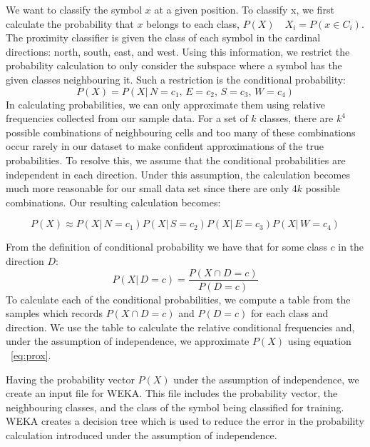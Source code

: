 
We want to classify the symbol $x$ at a given position.
To classify x, we first calculate the
probability that $x$ belongs to each class, $P(X)\quad X_i = P(x\!\in\! C_i)$.
The proximity classifier is given the class of each symbol in the
cardinal directions: north, south, east, and west. Using this information,
we restrict the probability calculation to only consider the subspace
where a symbol has the given classes neighbouring it. Such a restriction is
the conditional probability:
\[
P(X) = P(X|\,N\!=\!c_1,\,E\!=\!c_2,\,S\!=\!c_3,\,W\!=\!c_4)
\]
In calculating probabilities, we can only approximate them using relative
frequencies collected from our sample data. For a set of $k$ classes, there are $k^4$ possible combinations of neighbouring
cells and too many of these combinations occur rarely in our dataset to make
confident approximations of the true probabilities. To resolve this, we assume that
the conditional probabilities are independent in each direction. Under this
assumption, the calculation becomes much more reasonable for our small data set
since there are only $4k$ possible combinations. Our resulting calculation becomes:

\begin{equation} \label{eq:prox}
P(X) \approx P(X|\,N\!=\!c_1)P(X|\,S\!=\!c_2)P(X|\,E\!=\!c_3)P(X|\,W\!=\!c_4)
\end{equation}

From the definition of conditional probability we have that for some class $c$ in
the direction $D$:
\[ P(X|\,D\!=\!c) = \frac{P(X \cap D\!=\!c)}{P(D=c)} \]
To calculate each of the conditional probabilities,
we compute a table from the samples which records $P(X\cap D\!=\!c)$ and $P(D\!=\!c)$ for each class and direction.
We use the table to calculate the relative conditional frequencies and, under the assumption
of independence, we approximate $P(X)$ using equation ~\ref{eq:prox}.

Having the probability vector $P(X)$ under the assumption of independence, we create an input file for WEKA.
This file includes the probability vector, the neighbouring classes, and the class of the
symbol being classified for training. WEKA creates a decision tree which is used to reduce the error in the probability
calculation introduced under the assumption of independence.

